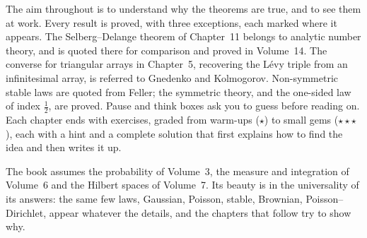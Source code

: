 The aim throughout is to understand why the theorems are true, and to see them at work. Every result is proved, with three exceptions, each marked where it appears. The Selberg--Delange theorem
of Chapter~11 belongs to analytic number theory, and is quoted there for comparison and proved in Volume~14. The converse for triangular arrays in Chapter~5, recovering the L\'evy triple from an infinitesimal array, is referred to Gnedenko and Kolmogorov. Non-symmetric stable laws are quoted from Feller; the symmetric theory, and the one-sided law of index $\frac12$, are proved. Pause and think
boxes ask you to guess before reading on. Each chapter ends with exercises, graded from warm-ups ($\star$) to small gems
($\star\star\star$), each with a hint and a complete solution that first explains how to find the idea and then writes it up.

The book assumes the probability of Volume~3, the measure and integration of Volume~6 and the Hilbert spaces of Volume~7. Its
beauty is in the universality of its answers: the same few laws, Gaussian, Poisson, stable, Brownian, Poisson--Dirichlet,
appear whatever the details, and the chapters that follow try to show why.
